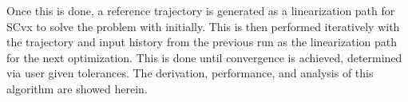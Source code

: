 Once this is done, a reference trajectory is generated as a linearization path for SCvx to solve the problem with initially. This is then performed iteratively with the trajectory and input history from the previous run as the linearization path for the next optimization. This is done until convergence is achieved, determined via user given tolerances. The derivation, performance, and analysis of this algorithm are showed herein.

















